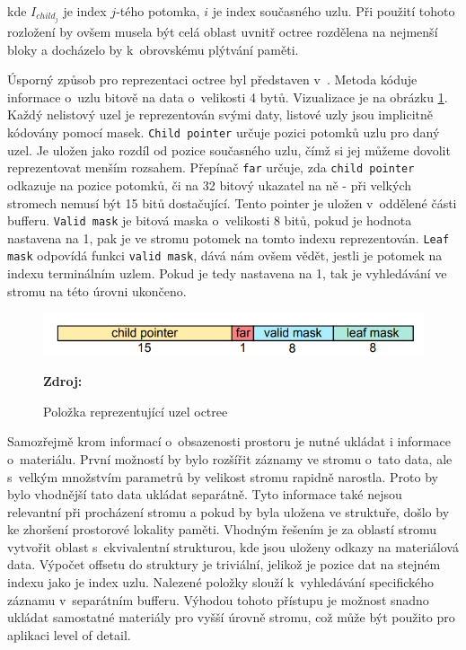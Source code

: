 kde $I_{child_j}$ je index $j$-tého potomka, $i$ je index současného uzlu. Při použití tohoto rozložení by ovšem musela být celá oblast uvnitř octree rozdělena na nejmenší bloky a docházelo by k~obrovskému plýtvání paměti.

Úsporný způsob pro reprezentaci octree byl představen v~\cite{Laine2011EfficientSV}. Metoda kóduje informace o~uzlu bitově na data o~velikosti 4 bytů. Vizualizace je na obrázku \ref{fig:octree_child}. Každý nelistový uzel je reprezentován svými daty, listové uzly jsou implicitně kódovány pomocí masek. \texttt{Child pointer} určuje pozici potomků uzlu pro daný uzel. Je uložen jako rozdíl od pozice současného uzlu, čímž si jej můžeme dovolit reprezentovat menším rozsahem. Přepínač \texttt{far} určuje, zda \texttt{child pointer} odkazuje na pozice potomků, či na 32 bitový ukazatel na ně - při velkých stromech nemusí být 15 bitů dostačující. Tento pointer je uložen v~oddělené části bufferu. \texttt{Valid mask} je bitová maska o~velikosti 8 bitů, pokud je hodnota nastavena na 1, pak je ve stromu potomek na tomto indexu reprezentován. \texttt{Leaf mask} odpovídá funkci \texttt{valid mask}, dává nám ovšem vědět, jestli je potomek na indexu terminálním uzlem. Pokud je tedy nastavena na 1, tak je vyhledávání ve stromu na této úrovni ukončeno.

\begin{figure}[H]
	\centering
	\includegraphics[scale=1.3]{obrazky-figures/octree_child_data.png}
	\caption{Položka reprezentující uzel octree}
	\textbf{Zdroj: \cite{Laine2011EfficientSV}}
	\label{fig:octree_child}
\end{figure}

Samozřejmě krom informací o~obsazenosti prostoru je nutné ukládat i informace o~materiálu. První možností by bylo rozšířit záznamy ve stromu o~tato data, ale s~velkým množstvím parametrů by velikost stromu rapidně narostla. Proto by bylo vhodnější tato data ukládat separátně. Tyto informace také nejsou relevantní při procházení stromu a pokud by byla uložena ve struktuře, došlo by ke zhoršení prostorové lokality paměti. Vhodným řešením je za oblastí stromu vytvořit oblast s~ekvivalentní strukturou, kde jsou uloženy odkazy na materiálová data. Výpočet offsetu do struktury je triviální, jelikož je pozice dat na stejném indexu jako je index uzlu. Nalezené položky slouží k~vyhledávání specifického záznamu v~separátním bufferu. Výhodou tohoto přístupu je možnost snadno ukládat samostatné materiály pro vyšší úrovně stromu, což může být použito pro aplikaci level of detail.

